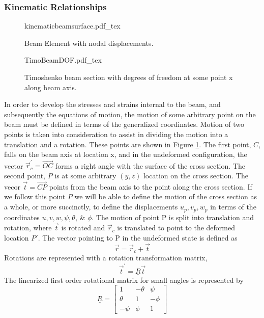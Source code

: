 \subsubsection{Kinematic Relationships} \label{Kinematic Relationships}
\begin{figure}
	\centering
	\def\svgwidth{400pt}
	{kinematicbeamsurface.pdf_tex}
	\caption{Beam Element with nodal displacements.}
	\label{fig:KineBeamElem}
\end{figure}
\begin{figure}
	\centering
	\def\svgwidth{250pt}
	{TimoBeamDOF.pdf_tex}
	\caption{Timoshenko beam section with degrees of freedom at some point x along beam axis.}
	\label{fig:TimoBeamDOF}
\end{figure}
In order to develop the stresses and strains internal to the beam, and subsequently the equations of motion, the motion of some arbitrary point on the beam must be defined in terms of the generalized coordinates. Motion of two points is taken into consideration to assist in dividing the motion into a translation and a rotation. These points are shown in Figure \ref{fig:KineBeamElem}. The first point, $ C $, falls on the beam axis at location x, and in the undeformed configuration, the vector $ \vec{r}_c^\prime= \overrightarrow{OC} $ forms a right angle with the surface of the cross section. The second point, $ P $ is at some arbitrary $ (y,z) $ location on the cross section. The vecor $ \vec{t}=\overrightarrow{CP} $ points from the beam axis to the point along the cross section. If we follow this point $ P $ we will be able to define the motion of the cross section as a whole, or more succinctly, to define the displacements $ u_p,v_p,w_p $ in terms of the coordinates $ u,v,w,\psi,\theta$, \& $\phi $. The motion of point P is split into translation and rotation, where $ \vec{t} $ is rotated and $ \vec{r}_c $ is translated to point to the deformed location $ P' $. The vector pointing to P in the undeformed state is defined as
\begin{equation}\label{eq:r}
\vec{r}=\vec{r}_c+\vec{t}
\end{equation}
Rotations are represented with a rotation transformation matrix,
\begin{equation}\label{eq:trot}
\vec{t}^\prime=\underline{R}\vec{t}
\end{equation}
The linearized first order rotational matrix for small angles is represented by 
\begin{equation}\label{eq:RotTransformation}
\underline{R}=\left[\begin{array}{ccc}
1&-\theta&\psi\\
\theta&1&-\phi\\
-\psi&\phi&1
\end{array}\right]
\end{equation}
